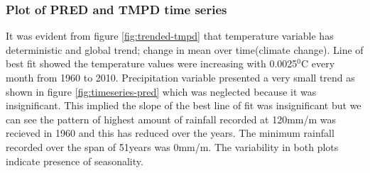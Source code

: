 \documentclass[12pt,a4paper]{article}
\begin{document}
\subsubsection{Plot of PRED and TMPD time series}
It was evident from figure \ref{fig:trended-tmpd} that temperature variable has deterministic and global trend; change in mean over time(climate change). Line of best fit showed the temperature values were increasing with 0.0025$^0$C every month from 1960 to 2010. Precipitation variable presented a very small trend as shown in figure \ref{fig:timeseries-pred} which was neglected because it was insignificant. This implied the slope of the best line of fit was insignificant but we can see the pattern of highest amount of rainfall recorded at 120mm/m was recieved in 1960 and this has reduced over the years. The minimum rainfall recorded over the span of 51years was 0mm/m. The variability in both plots indicate presence of seasonality.
\newpage
\end{document}
